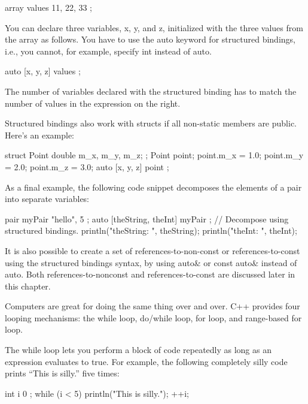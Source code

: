 \begin{cpp}
array values { 11, 22, 33 };
\end{cpp}

You can declare three variables, x, y, and z, initialized with the three values from the array as follows. You have to use the auto keyword for structured bindings, i.e., you cannot, for example, specify int instead of auto.

\begin{cpp}
auto [x, y, z] { values };
\end{cpp}

The number of variables declared with the structured binding has to match the number of values in the expression on the right.

Structured bindings also work with structs if all non-static members are public. Here’s an example:

\begin{cpp}
struct Point { double m_x, m_y, m_z; };
Point point;
point.m_x = 1.0; point.m_y = 2.0; point.m_z = 3.0;
auto [x, y, z] { point };
\end{cpp}

As a final example, the following code snippet decomposes the elements of a pair into separate variables:

\begin{cpp}
pair myPair { "hello", 5 };
auto [theString, theInt] { myPair }; // Decompose using structured bindings.
println("theString: {}", theString);
println("theInt: {}", theInt);
\end{cpp}

It is also possible to create a set of references-to-non-const or references-to-const using the structured bindings syntax, by using auto\& or const auto\& instead of auto. Both references-to-nonconst and references-to-const are discussed later in this chapter.


Computers are great for doing the same thing over and over. C++ provides four looping mechanisms: the while loop, do/while loop, for loop, and range-based for loop.


The while loop lets you perform a block of code repeatedly as long as an expression evaluates to true. For example, the following completely silly code prints “This is silly.” five times:

\begin{cpp}
int i { 0 };
while (i < 5) {
    println("This is silly.");
    ++i;
}
\end{cpp}

